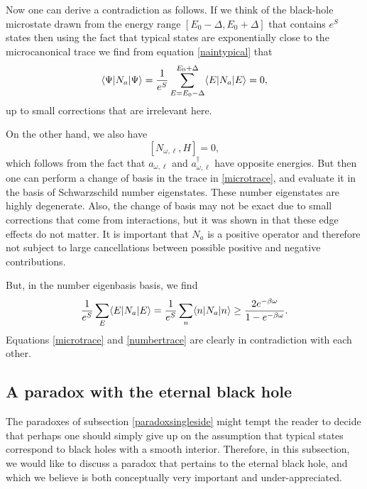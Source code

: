 \documentclass[12pt]{article}
\def\schwarzn{N}
\newcommand{\be}{\begin{equation}}
\newcommand{\ee}{\end{equation}}
\begin{document}
Now one can derive a contradiction as follows. If we think of the black-hole microstate drawn from the energy range $[E_0 - \Delta, E_0 + \Delta]$ that contains $e^{S}$ states then using the fact that typical states are exponentially close to the microcanonical trace we find from equation \eqref{naintypical} that
\be
\label{microtrace}
\langle \Psi | N_a | \Psi \rangle = {1 \over e^{S}} \sum_{E=E_0 - \Delta}^{E_0 + \Delta} \langle E | N_a | E \rangle  = 0,
\ee
up to small corrections that are irrelevant here.

On the other hand, we also have
\be
\label{nomegcommut}
[\schwarzn_{\omega, \ell}, H] = 0,
\ee
which follows from the fact that $a_{\omega, \ell}$ and $a_{\omega, \ell}^{\dagger}$ have opposite energies. But then one can perform a change of basis in the trace in \eqref{microtrace}, and evaluate it in the basis of Schwarzschild number eigenstates.  These  number eigenstates are highly degenerate. Also, the change of basis may not be exact due to small corrections that come from interactions, but it was shown in \cite{Papadodimas:2015jra} that these edge effects do not matter. It is important that $N_a$ is a positive operator and therefore not subject to large cancellations between possible positive and negative contributions.

But, in the number eigenbasis basis, we find
\be
\label{numbertrace}
{1 \over e^{S}} \sum_{E} \langle E | N_a | E \rangle  =  {1 \over e^{S}} \sum_n \langle n | N_a | n \rangle \geq {2 e^{-\beta \omega} \over 1 - e^{-\beta \omega}}.
\ee
Equations \eqref{microtrace} and \eqref{numbertrace} are clearly in contradiction with each other.











\subsection{A paradox with the eternal black hole \label{paradoxeternal}}
The paradoxes  of subsection \ref{paradoxsingleside} might tempt the reader to decide that perhaps one should
simply give up on the assumption that typical states correspond to black holes with a smooth interior. Therefore, in this subsection, we would like to discuss a
paradox that pertains to the eternal black hole, and which we believe is both conceptually very important and under-appreciated.
\end{document}
